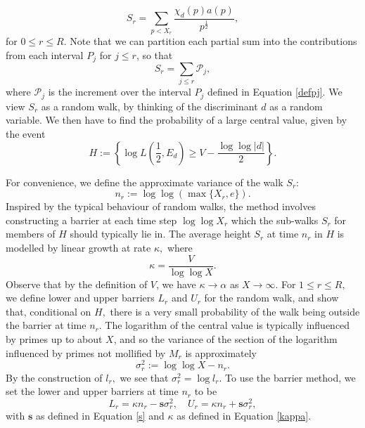 \documentclass[12pt]{amsart}
\numberwithin{equation}{section}
\numberwithin{thm}{section}
\newcommand{\1}{\mathbf 1}
\begin{document}
\begin{equation} \label{subwalk} S_{r}=\sum_{p< X_r} \frac{\chi_d(p)a(p)}{p^{\frac{1}{2}}},\end{equation}
for $0\le r\le R.$ 
Note that we can partition each partial sum into the contributions from each interval $P_j$ for $j\le r$, so that \begin{equation}
	S_r=\sum_{j\le r}\mathscr{P}_j,
\end{equation} where $\mathscr{P}_j$ is the increment over the interval $P_j$ defined in Equation \eqref{defpj}. We view $S_r$ as a random walk, by thinking of the discriminant $d$ as a random variable. We then have to find the probability of a large central value, given by the event \begin{equation}
	H:=\left\{\log L\left(\frac{1}{2},E_d\right)\ge V-\frac{\log\log |d|}{2}\right\}.
\end{equation} 

For convenience, we define the approximate  variance of the walk $S_r:$ \begin{equation}
	n_r:=\log\log \left(\max\{X_r,e\}\right).
\end{equation}  Inspired by the typical behaviour of random walks, the method involves constructing a barrier at each time step $\log \log X_r$ which the sub-walks $S_{r}$ for members of $H$ should typically lie in. 
The average height $S_r$  at time $n_r$  in $H$  is modelled by linear growth  at rate $\kappa,$ where \begin{equation}\label{kappa}
	\kappa=\frac{V}{\log\log X}.
\end{equation}
Observe that by the definition of $V$, we have $\kappa \to \alpha$ as $X\to\infty$. For $1\le r\le R,$ we define  lower and upper barriers $L_r$ and  $U_r$ for the random walk, and show that, conditional on $H,$ there is a very small probability of the walk being outside the barrier at time $n_r$. The logarithm of the central value is typically influenced by primes up to about $X$, and so the variance of the section of the logarithm influenced by primes not mollified by $M_r$ is approximately \begin{equation}
	\sigma^2_r:=\log\log X-n_r.
\end{equation} 
By the construction of $l_r,$ we see that $\sigma^2_r=\log l_r.$ To use the barrier method, we set the lower and upper barriers at time $n_r$ to be \begin{equation} L_r=\kappa n_r-\mathbf{s}\sigma^2_{r},\quad
U_r=\kappa n_r+\mathbf{s} \sigma^2_r,\end{equation} with $\mathbf{s}$ as defined in Equation \eqref{s} and $\kappa$ as defined in Equation \eqref{kappa}. 
\end{document}
